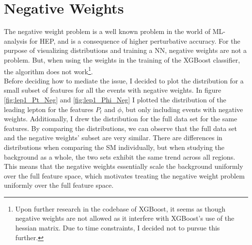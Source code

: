 \section{Negative Weights}\label{subsec:negWeights}
The negative weight problem is a well known problem in the world of \ac{ML}-analysis for \ac{HEP}, 
and is a consequence of higher perturbative accuracy. For the purpose of visualizing 
distributions and training a \ac{NN}, negative weights are not a problem. But, when using 
the weights in the training of the XGBoost classifier, the algorithm does not work\footnote{Upon further research 
in the codebase of XGBoost, it seems as though negative weights are not allowed as it interfere with XGBoost's use 
of the hessian matrix. Due to time constraints, I decided not to  pursue this further.}.  
\\
Before deciding how to mediate the issue, I decided to plot the distribution for 
a small subset of features for all the events with negative weights.
In figure \ref{fig:lep1_Pt_Neg} and \ref{fig:lep1_Phi_Neg} I plotted the distribution of the leading 
lepton for the features $P_t$ and $\phi$, but only including events with negative weights.
Additionally, I drew the distribution for the full data set for the same features. By comparing the 
distributions, we can observe that the full data set and the negative weights' subset are very 
similar. There are differences in distributions when comparing the \ac{SM} individually, but when 
studying the background as a whole, the two sets exhibit the same trend across all regions. 
This means that the negative weights essentially scale the background uniformly over the full feature 
space, which motivates treating the negative weight problem uniformly over the full feature space.
